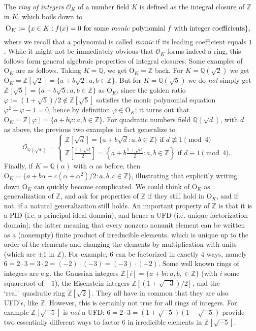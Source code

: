 \documentclass[a4paper,USenglish,cleveref, autoref, thm-restate]{lipics-v2021}
\newcommand{\OK}{\mathrm{O}_K}
\newcommand{\Q}{\mathbb{Q}}
\newcommand{\Z}{\mathbb{Z}}
\begin{document}
The \emph{ring of integers} $\mathcal{O}_K$ of a number field $K$ is defined as the integral closure of $\Z$ in $K$, which boils down to
\[\OK := \{x \in K : f(x)=0 \text{ for some \emph{monic} polynomial } f \text{ with integer coefficients}\},\]
where we recall that a polynomial is called \emph{monic} if its leading coefficient equals $1$.
While it might not be immediately obvious that $\mathcal{O}_K$ forms indeed a ring, this follows form general algebraic properties of integral closures.
Some examples of $\OK$ are as follows. Taking $K=\Q$, we get $\OK=\Z$ back. For $K=\Q(\sqrt{2})$ we get $\OK=\Z[\sqrt{2}]=\{a+b\sqrt{2} : a,b \in \Z\}$. But for $K=\Q(\sqrt{5})$ we do \emph{not} simply get $\Z[\sqrt{5}]=\{a+b\sqrt{5} : a,b \in \Z\}$ as $\OK$, since the golden ratio $\varphi:=(1+\sqrt{5})/2\not\in \Z[\sqrt{5}]$ satisfies the monic polynomial equation $\varphi^2-\varphi-1=0$, hence by definition $\varphi \in \OK$; it turns out that $\OK=\Z[\varphi]=\{a+b\varphi : a,b \in \Z\}$. For quadratic numbers field $\Q(\sqrt{d})$, with $d$ as above, the previous two examples in fact generalize to
\begin{equation*}
\mathcal{O}_{\Q(\sqrt{d})}=
\begin{cases}
\Z[\sqrt{d}]=\{a+b\sqrt{d}: a,b \in \Z\} \text { if } d \not\equiv 1 \pmod{4}\\
 \Z\left[\frac{1+\sqrt{d}}{2}\right]=\left\{a+b \frac{1+\sqrt{d}}{2} : a,b \in \Z \right\} \text { if } d \equiv 1 \pmod{4}.
\end{cases}
\end{equation*}
Finally, if $K=\Q(\alpha)$ with $\alpha$ as before, then $\OK=\{a+b \alpha+c (\alpha+\alpha^2)/2 : a,b,c \in \Z\}$, illustrating that explicitly writing down $\OK$ can quickly become complicated.
We could think of $\OK$ as generalization of $\Z$, and ask for properties of $\Z$ if they still hold in $\OK$, and if not, if a natural generalization still holds. An important property of $\Z$ is that it is a PID (i.e. a principal ideal domain), and hence a UFD (i.e. unique factorization domain); the latter meaning that every nonzero nonunit element can be written as a (nonempty) finite product of irreducible elements, which is unique up to the order of the elements and changing the elements by multiplication with units (which are $\pm 1$ in $\Z$).
For example, $6$ can be factorized in exactly 4 ways, namely $6=2\cdot 3=3\cdot2=(-2)\cdot (-3)=(-3) \cdot (-2)$. Some well known rings of integers are e.g. the Gaussian integers $\Z[i]=\{a+b i : a,b, \in \Z\}$ (with $i$ some squareroot of $-1$), the Eisenstein integers $\Z[(1+\sqrt{-3})/2]$, and the \lq real\rq\ quadratic ring $\Z[\sqrt{2}]$. They all have in common that they are also UFD's, like $\Z$. However, this is certainly not true for all rings of integers. For example $\Z[\sqrt{-5}]$ is \emph{not} a UFD: $6=2\cdot3=(1+\sqrt{-5}) (1-\sqrt{-5})$ provide two essentially different ways to factor $6$ in irredicible elements in $\Z[\sqrt{-5}]$.
\end{document}
